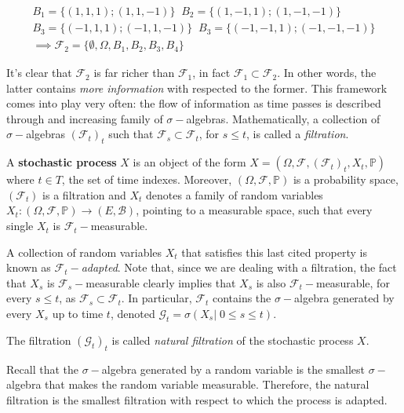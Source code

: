 \begin{gather*}
    B_1 = \Big\{ (1,1,1) ; (1,1,-1) \Big\} \;\; B_2 = \Big\{ (1,-1,1); (1,-1,-1) \Big\} \\
    B_3 = \Big\{ (-1,1,1) ; (-1,1,-1) \Big\} \;\;     B_3 = \Big\{ (-1,-1,1) ; (-1,-1,-1) \Big\} \\
    \implies \mathcal{F_2} = \Big\{ \emptyset, \Omega, B_1,B_2,B_3,B_4 \Big\}
\end{gather*}

It's clear that $\mathcal{F}_2$ is far richer than $\mathcal{F}_1$, in fact $\mathcal{F}_1 \subset \mathcal{F}_2$. In other words, the latter contains \textit{more information} with respected to the former. This framework comes into play very often: the flow of information as time passes is described through and increasing family of $\sigma-$algebras. Mathematically, a collection of $\sigma-$algebras $(\mathcal{F}_t)_t$ such that $\mathcal{F}_s \subset \mathcal{F}_t$, for $s \leq t$, is called a \textit{filtration}.

\begin{definition}
    A \textbf{stochastic process} $X$ is an object of the form $X = (\Omega, \mathcal{F}, (\mathcal{F}_t)_t, X_t, \mathbb{P})$ where $t \in T$, the set of time indexes. Moreover, $(\Omega, \mathcal{F}, \mathbb{P})$ is a probability space, $(\mathcal{F}_t)$ is a filtration and $X_t$ denotes a family of random variables $X_t : (\Omega,\mathcal{F},\mathbb{P}) \to (E,\mathcal{B})$, pointing to a measurable space, such that every single $X_t$ is $\mathcal{F}_t-$measurable. 
\end{definition}

A collection of random variables $X_t$ that satisfies this last cited property is known as $\mathcal{F}_t-$\textit{adapted}. Note that, since we are dealing with a filtration, the fact that $X_s$ is $\mathcal{F}_s-$measurable clearly implies that $X_s$ is also $\mathcal{F}_t-$measurable, for every $s \leq t$, as $\mathcal{F}_s \subset \mathcal{F}_t$. In particular, $\mathcal{F}_t$ contains the $\sigma-$algebra generated by every $X_s$ up to time $t$, denoted $\mathcal{G}_t = \sigma(X_s \vert \; 0 \leq s \leq t)$. 

\begin{definition}
    The filtration $(\mathcal{G}_t)_t$ is called \textit{natural filtration} of the stochastic process $X$.
\end{definition}

Recall that the $\sigma-$algebra generated by a random variable is the smallest $\sigma-$algebra that makes the random variable measurable. Therefore, the natural filtration is the smallest filtration with respect to which the process is adapted. 

